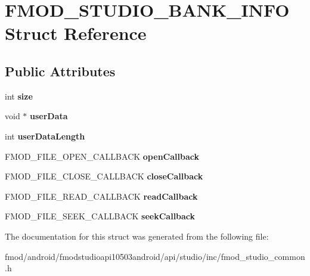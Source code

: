 \hypertarget{struct_f_m_o_d___s_t_u_d_i_o___b_a_n_k___i_n_f_o}{\section{F\+M\+O\+D\+\_\+\+S\+T\+U\+D\+I\+O\+\_\+\+B\+A\+N\+K\+\_\+\+I\+N\+F\+O Struct Reference}
\label{struct_f_m_o_d___s_t_u_d_i_o___b_a_n_k___i_n_f_o}
}
\subsection*{Public Attributes}
\begin{DoxyCompactItemize}
\item 
\hypertarget{struct_f_m_o_d___s_t_u_d_i_o___b_a_n_k___i_n_f_o_a2dff47aa8488effc475942041afddcba}{int {\bfseries size}}\label{struct_f_m_o_d___s_t_u_d_i_o___b_a_n_k___i_n_f_o_a2dff47aa8488effc475942041afddcba}

\item 
\hypertarget{struct_f_m_o_d___s_t_u_d_i_o___b_a_n_k___i_n_f_o_a73d6c3f95a944457fd39fd1f9ae94efd}{void $\ast$ {\bfseries user\+Data}}\label{struct_f_m_o_d___s_t_u_d_i_o___b_a_n_k___i_n_f_o_a73d6c3f95a944457fd39fd1f9ae94efd}

\item 
\hypertarget{struct_f_m_o_d___s_t_u_d_i_o___b_a_n_k___i_n_f_o_a90982280294420e89fb874762ec16c9f}{int {\bfseries user\+Data\+Length}}\label{struct_f_m_o_d___s_t_u_d_i_o___b_a_n_k___i_n_f_o_a90982280294420e89fb874762ec16c9f}

\item 
\hypertarget{struct_f_m_o_d___s_t_u_d_i_o___b_a_n_k___i_n_f_o_adca2f50546c854f4a8543c4bf391ec7b}{F\+M\+O\+D\+\_\+\+F\+I\+L\+E\+\_\+\+O\+P\+E\+N\+\_\+\+C\+A\+L\+L\+B\+A\+C\+K {\bfseries open\+Callback}}\label{struct_f_m_o_d___s_t_u_d_i_o___b_a_n_k___i_n_f_o_adca2f50546c854f4a8543c4bf391ec7b}

\item 
\hypertarget{struct_f_m_o_d___s_t_u_d_i_o___b_a_n_k___i_n_f_o_aeb697d29d440c16d9c4c9fd64b51dcdc}{F\+M\+O\+D\+\_\+\+F\+I\+L\+E\+\_\+\+C\+L\+O\+S\+E\+\_\+\+C\+A\+L\+L\+B\+A\+C\+K {\bfseries close\+Callback}}\label{struct_f_m_o_d___s_t_u_d_i_o___b_a_n_k___i_n_f_o_aeb697d29d440c16d9c4c9fd64b51dcdc}

\item 
\hypertarget{struct_f_m_o_d___s_t_u_d_i_o___b_a_n_k___i_n_f_o_a759efe9ad0451fea2a7613662ea031d7}{F\+M\+O\+D\+\_\+\+F\+I\+L\+E\+\_\+\+R\+E\+A\+D\+\_\+\+C\+A\+L\+L\+B\+A\+C\+K {\bfseries read\+Callback}}\label{struct_f_m_o_d___s_t_u_d_i_o___b_a_n_k___i_n_f_o_a759efe9ad0451fea2a7613662ea031d7}

\item 
\hypertarget{struct_f_m_o_d___s_t_u_d_i_o___b_a_n_k___i_n_f_o_ae6151d74ef16977017ac3e3e7d556818}{F\+M\+O\+D\+\_\+\+F\+I\+L\+E\+\_\+\+S\+E\+E\+K\+\_\+\+C\+A\+L\+L\+B\+A\+C\+K {\bfseries seek\+Callback}}\label{struct_f_m_o_d___s_t_u_d_i_o___b_a_n_k___i_n_f_o_ae6151d74ef16977017ac3e3e7d556818}

\end{DoxyCompactItemize}


The documentation for this struct was generated from the following file\+:\begin{DoxyCompactItemize}
\item 
fmod/android/fmodstudioapi10503android/api/studio/inc/fmod\+\_\+studio\+\_\+common.\+h\end{DoxyCompactItemize}
